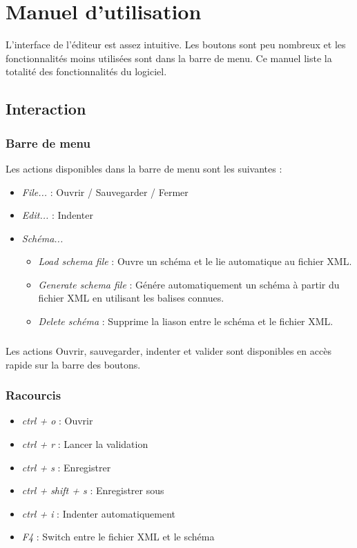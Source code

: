 \chapter{Manuel d'utilisation}

L'interface de l'éditeur est assez intuitive. Les boutons sont peu nombreux et les fonctionnalités moins utilisées sont dans la barre de menu.
Ce manuel liste la totalité des fonctionnalités du logiciel.

\section{Interaction}

\subsection{Barre de menu}


Les actions disponibles dans la barre de menu sont les suivantes :
\begin{itemize}
\item \emph{File...} : Ouvrir / Sauvegarder / Fermer
\item \emph{Edit...} : Indenter
\item \emph{Schéma...}
	\begin{itemize}
	\item \emph{Load schema file} : Ouvre un schéma et le lie automatique au fichier XML.
	\item \emph{Generate schema file} : Génére automatiquement un schéma à partir du fichier XML en utilisant les balises connues.
	\item \emph{Delete schéma} : Supprime la liason entre le schéma et le fichier XML.
	\end{itemize}
\end{itemize}

\paragraph{}
Les actions Ouvrir, sauvegarder, indenter et valider sont disponibles en accès rapide sur la barre des boutons.

\subsection{Racourcis}
\begin{itemize}
\item \emph{ctrl + o} : Ouvrir
\item \emph{ctrl + r} : Lancer la validation
\item \emph{ctrl + s} : Enregistrer 
\item \emph{ctrl + shift + s} : Enregistrer sous
\item \emph{ctrl + i} : Indenter automatiquement
\item \emph{F4} : Switch entre le fichier XML et le schéma
\end{itemize}


